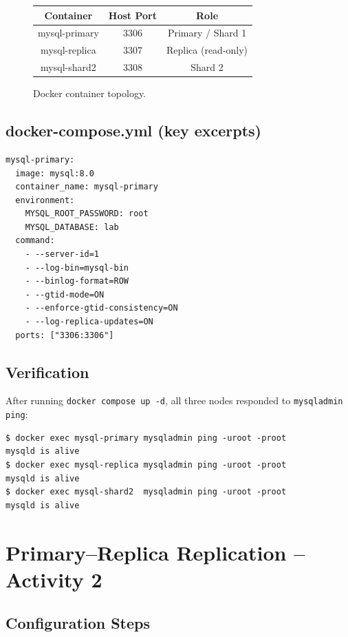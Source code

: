 \documentclass[12pt,a4paper]{article}
\begin{document}
\begin{figure}[H]
\centering
\begin{tabular}{|c|c|c|}
\hline
\textbf{Container} & \textbf{Host Port} & \textbf{Role} \\
\hline
mysql-primary  & 3306 & Primary / Shard 1 \\
mysql-replica  & 3307 & Replica (read-only) \\
mysql-shard2   & 3308 & Shard 2 \\
\hline
\end{tabular}
\caption{Docker container topology.}
\end{figure}

\subsection{docker-compose.yml (key excerpts)}

\begin{lstlisting}[style=sqlstyle, caption={Primary node configuration.}]
mysql-primary:
  image: mysql:8.0
  container_name: mysql-primary
  environment:
    MYSQL_ROOT_PASSWORD: root
    MYSQL_DATABASE: lab
  command:
    - --server-id=1
    - --log-bin=mysql-bin
    - --binlog-format=ROW
    - --gtid-mode=ON
    - --enforce-gtid-consistency=ON
    - --log-replica-updates=ON
  ports: ["3306:3306"]
\end{lstlisting}

\subsection{Verification}

After running \texttt{docker compose up -d}, all three nodes responded to
\texttt{mysqladmin ping}:

\begin{lstlisting}[style=bashstyle, caption={All nodes alive.}]
$ docker exec mysql-primary mysqladmin ping -uroot -proot
mysqld is alive
$ docker exec mysql-replica mysqladmin ping -uroot -proot
mysqld is alive
$ docker exec mysql-shard2  mysqladmin ping -uroot -proot
mysqld is alive
\end{lstlisting}

\section{Primary--Replica Replication -- Activity 2}

\subsection{Configuration Steps}
\end{document}
